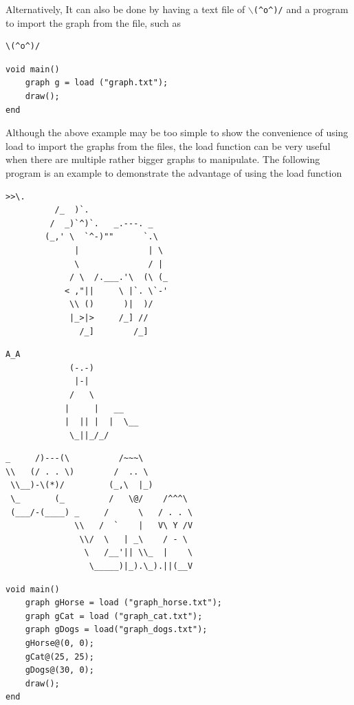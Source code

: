 \documentclass[11pt,letterpaper]{article}
\begin{document}
Alternatively, It can also be done by having a text file of \texttt{$\backslash$(\^{}o\^{})/} and a program to import the graph from the file, such as

\begin{lstlisting}[caption=graph.txt, label=hail_face, captionpos=b, tabsize=4]
						\(^o^)/
\end{lstlisting}

\begin{lstlisting}[caption=hailv2.adl, label=hailv2, captionpos=b, tabsize=4, frame=single]
void main()
	graph g = load ("graph.txt");
	draw();
end
\end{lstlisting}

Although the above example may be too simple to show the convenience of using load to import the graphs from the files, the load function can be very useful when there are multiple rather bigger graphs to manipulate. The following program is an example to demonstrate the advantage of using the load function
\pagebreak
\begin{lstlisting}[caption=graph\_horse.txt, label=horse, captionpos=b]
		   >>\.
		  /_  )`.
		 /  _)`^)`.   _.---. _
		(_,' \  `^-)""      `.\
		      |              | \
		      \              / |
		     / \  /.___.'\  (\ (_
		    < ,"||     \ |`. \`-'
		     \\ ()      )|  )/
		     |_>|>     /_] //
		       /_]        /_]
\end{lstlisting}

\begin{lstlisting}[caption=graph\_cat.txt, label=cat, captionpos=b]
			  A_A
			 (-.-)
			  |-|
			 /   \
			|     |   __
			|  || |  |  \__
			 \_||_/_/
\end{lstlisting}

\begin{lstlisting}[caption=graph\_dogs.txt, label=dogs, captionpos=b]
_     /)---(\          /~~~\
\\   (/ . . \)        /  .. \
 \\__)-\(*)/         (_,\  |_)
 \_       (_         /   \@/    /^^^\
 (___/-(____) _     /      \   / . . \
              \\   /  `    |   V\ Y /V
               \\/  \   | _\    / - \
                \   /__'|| \\_  |    \
                 \_____)|_).\_).||(__V
\end{lstlisting}

\begin{lstlisting}[caption=animals.adl, label=animal, captionpos=b, tabsize=4, frame=single]
void main()
	graph gHorse = load ("graph_horse.txt");
	graph gCat = load ("graph_cat.txt");
	graph gDogs = load("graph_dogs.txt");
	gHorse@(0, 0);
	gCat@(25, 25);
	gDogs@(30, 0);
	draw();
end
\end{lstlisting}
\end{document}
